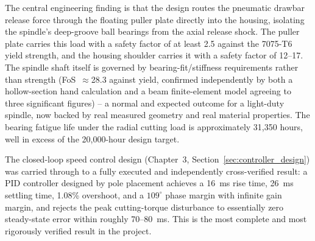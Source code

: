 \documentclass[12pt,a4paper]{report}
\begin{document}
	The central engineering finding is that the design routes the pneumatic drawbar release
	force through the floating puller plate directly into the housing, isolating the spindle's
	deep-groove ball bearings from the axial release shock. The puller plate carries this load
	with a safety factor of at least 2.5 against the 7075-T6 yield strength, and the housing
	shoulder carries it with a safety factor of 12--17. The spindle shaft itself is governed by
	bearing-fit/stiffness requirements rather than strength (FoS~$\approx$28.3 against yield,
	confirmed independently by both a hollow-section hand calculation and a beam finite-element
	model agreeing to three significant figures) -- a normal and expected outcome for a
	light-duty spindle, now backed by real measured geometry and real material properties. The
	bearing fatigue life under the radial cutting load is approximately 31,350 hours, well in
	excess of the 20,000-hour design target.
	
	The closed-loop speed control design (Chapter~3, Section~\ref{sec:controller_design}) was carried through to a fully
	executed and independently cross-verified result: a PID controller designed by pole placement
	achieves a 16~ms rise time, 26~ms settling time, 1.08\% overshoot, and a $109^\circ$ phase
	margin with infinite gain margin, and rejects the peak cutting-torque disturbance to
	essentially zero steady-state error within roughly 70--80~ms. This is the most complete and
	most rigorously verified result in the project.
	
\end{document}
